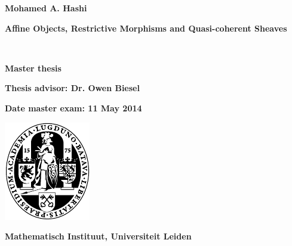 \thispagestyle{empty}
\vspace*{7em}

\begin{center}

{\large\textbf{Mohamed A. Hashi}\par} \vspace{3em} {\LARGE \textbf{Affine Objects, Restrictive Morphisms and Quasi-coherent Sheaves}\par} \
\vspace{3em} 

{\large\textbf{Master thesis}\par} \vspace{1em} {\large\textbf{Thesis advisor: Dr. Owen Biesel} \par} \vspace{3em} 
{\large\textbf{Date master exam: 11 May 2014}\par}\vfill

\includegraphics{ulzegel.pdf}\\

\vspace{2em}

{\large\textbf{Mathematisch Instituut, Universiteit Leiden}}

\end{center}